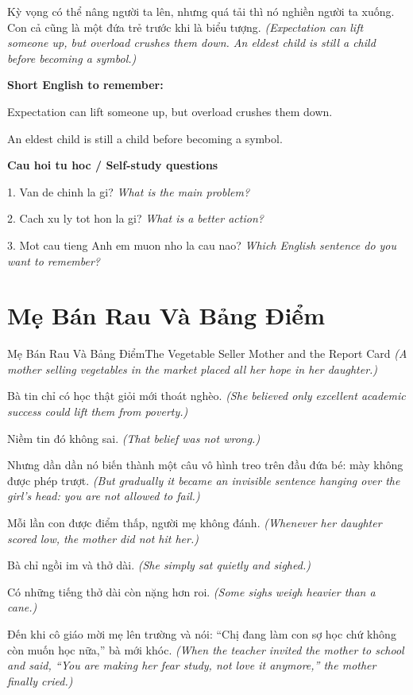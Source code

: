 \begin{baihoc}
Kỳ vọng có thể nâng người ta lên, nhưng quá tải thì nó nghiền người ta xuống. Con cả cũng là một đứa trẻ trước khi là biểu tượng.
\textit{(Expectation can lift someone up, but overload crushes them down. An eldest child is still a child before becoming a symbol.)}
\end{baihoc}

\begin{ghinhoanh}
\textbf{Short English to remember:}

Expectation can lift someone up, but overload crushes them down.

An eldest child is still a child before becoming a symbol.

\end{ghinhoanh}

\begin{tuhocnhanh}
\textbf{Cau hoi tu hoc / Self-study questions}

1. Van de chinh la gi? \textit{What is the main problem?}

2. Cach xu ly tot hon la gi? \textit{What is a better action?}

3. Mot cau tieng Anh em muon nho la cau nao? \textit{Which English sentence do you want to remember?}
\end{tuhocnhanh}
\ngancach

\section{Mẹ Bán Rau Và Bảng Điểm}
\begin{truyen}{Mẹ Bán Rau Và Bảng Điểm}{The Vegetable Seller Mother and the Report Card}
\textit{(A mother selling vegetables in the market placed all her hope in her daughter.)}

Bà tin chỉ có học thật giỏi mới thoát nghèo.
\textit{(She believed only excellent academic success could lift them from poverty.)}

Niềm tin đó không sai.
\textit{(That belief was not wrong.)}

Nhưng dần dần nó biến thành một câu vô hình treo trên đầu đứa bé: mày không được phép trượt.
\textit{(But gradually it became an invisible sentence hanging over the girl’s head: you are not allowed to fail.)}

Mỗi lần con được điểm thấp, người mẹ không đánh.
\textit{(Whenever her daughter scored low, the mother did not hit her.)}

Bà chỉ ngồi im và thở dài.
\textit{(She simply sat quietly and sighed.)}

Có những tiếng thở dài còn nặng hơn roi.
\textit{(Some sighs weigh heavier than a cane.)}

Đến khi cô giáo mời mẹ lên trường và nói: ``Chị đang làm con sợ học chứ không còn muốn học nữa,'' bà mới khóc.
\textit{(When the teacher invited the mother to school and said, ``You are making her fear study, not love it anymore,'' the mother finally cried.)}

\end{truyen}


